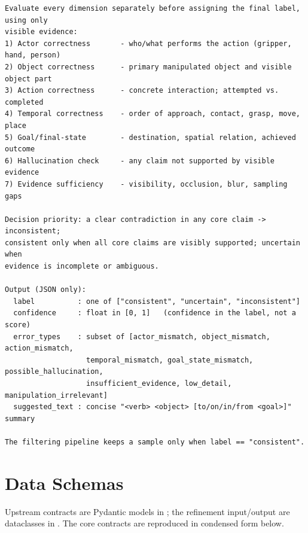 \documentclass[11pt,oneside]{report}
\begin{document}
\begin{lstlisting}
Evaluate every dimension separately before assigning the final label, using only
visible evidence:
1) Actor correctness       - who/what performs the action (gripper, hand, person)
2) Object correctness      - primary manipulated object and visible object part
3) Action correctness      - concrete interaction; attempted vs. completed
4) Temporal correctness    - order of approach, contact, grasp, move, place
5) Goal/final-state        - destination, spatial relation, achieved outcome
6) Hallucination check     - any claim not supported by visible evidence
7) Evidence sufficiency    - visibility, occlusion, blur, sampling gaps

Decision priority: a clear contradiction in any core claim -> inconsistent;
consistent only when all core claims are visibly supported; uncertain when
evidence is incomplete or ambiguous.

Output (JSON only):
  label          : one of ["consistent", "uncertain", "inconsistent"]
  confidence     : float in [0, 1]   (confidence in the label, not a score)
  error_types    : subset of [actor_mismatch, object_mismatch, action_mismatch,
                   temporal_mismatch, goal_state_mismatch, possible_hallucination,
                   insufficient_evidence, low_detail, manipulation_irrelevant]
  suggested_text : concise "<verb> <object> [to/on/in/from <goal>]" summary

The filtering pipeline keeps a sample only when label == "consistent".
\end{lstlisting}

\chapter{Data Schemas}
Upstream contracts are Pydantic models in
; the refinement input/output are
dataclasses in . The core contracts are
reproduced in condensed form below.
\end{document}
